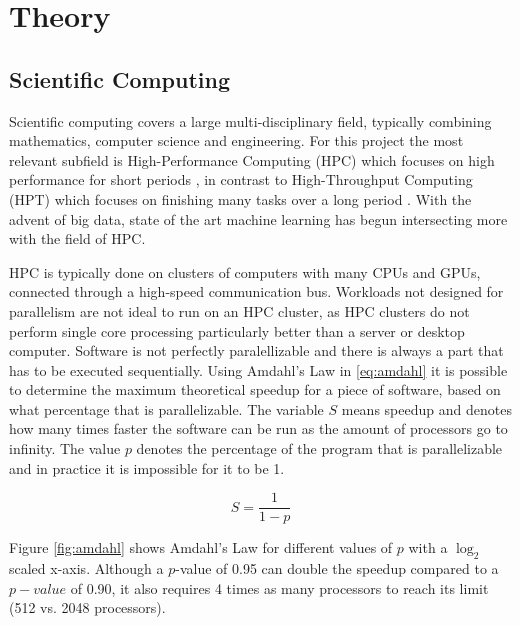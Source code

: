 \chapter{Theory}

\section{Scientific Computing}

Scientific computing covers a large multi-disciplinary field, typically combining mathematics, computer science and engineering. For this project the most relevant subfield is High-Performance Computing (HPC) which focuses on high performance for short periods \cite{larsen:hpc}, in contrast to High-Throughput Computing (HPT) which focuses on finishing many tasks over a long period \cite{wisc:htcondor}. With the advent of big data, state of the art machine learning has begun intersecting more with the field of HPC.

HPC is typically done on clusters of computers with many CPUs and GPUs, connected through a high-speed communication bus. Workloads not designed for parallelism are not ideal to run on an HPC cluster, as HPC clusters do not perform single core processing particularly better than a server or desktop computer. Software is not perfectly paralellizable and there is always a part that has to be executed sequentially. Using Amdahl's Law \cite{larsen:hpc} in \eqref{eq:amdahl} it is possible to determine the maximum theoretical speedup for a piece of software, based on what percentage that is parallelizable. The variable $S$ means speedup and denotes how many times faster the software can be run as the amount of processors go to infinity. The value $p$ denotes the percentage of the program that is parallelizable and in practice it is impossible for it to be 1.

\begin{equation} \label{eq:amdahl}
    S = \frac{1}{1 - p}
\end{equation}

Figure \ref{fig:amdahl} shows Amdahl's Law for different values of $p$ with a $\log_2$ scaled x-axis. Although a $p$-value of 0.95 can double the speedup compared to a $p-value$ of 0.90, it also requires 4 times as many processors to reach its limit (512 vs. 2048 processors).

